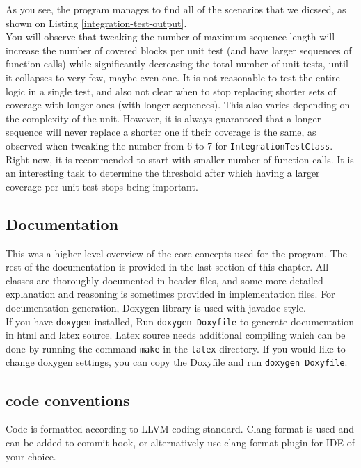 \documentclass{elteikthesis}[2018/06/06]
\newcommand*{\code}{\lstinline[keywordstyle=\color{violet}, basicstyle=\color{violet}]}
\renewcommand{\footnote}{\endnote}
\begin{document}
As you see, the program manages to find all of the scenarios that we dicssed, as shown on Listing \ref{integration-test-output}. \\

You will observe that tweaking the number of maximum sequence length will increase the number of covered blocks per unit test (and have larger sequences of function calls) while significantly decreasing the total number of unit tests, until it collapses to very few, maybe even one. It is not reasonable to test the entire logic in a single test, and also not clear when to stop replacing shorter sets of coverage with longer ones (with longer sequences). This also varies depending on the complexity of the unit. However, it is always guaranteed that a longer sequence will never replace a shorter one if their coverage is the same, as observed when tweaking the number from 6 to 7 for \code{IntegrationTestClass}. \\
Right now, it is recommended to start with smaller number of function calls. It is an interesting task to determine the threshold after which having a larger coverage per unit test stops being important. \\

\subsection{Documentation}
\label{sec-3-1-3}
This was a higher-level overview of the core concepts used for the program. The rest of the documentation is provided in the last section of this chapter. All classes are thoroughly documented in header files, and some more detailed explanation and reasoning is sometimes provided in implementation files. For documentation generation, Doxygen library is used with javadoc style. \\

If you have \code{doxygen} installed, Run \code{doxygen Doxyfile} to generate documentation in html and latex source. Latex source needs additional compiling which can be done by running the command \code{make} in the \code{latex} directory. If you would like to change doxygen settings, you can copy the Doxyfile and run \code{doxygen Doxyfile}. \\
\subsection{code conventions}
\label{sec-3-1-4}
Code is formatted according to LLVM coding standard\footnote{DEFINITION NOT FOUND.}. Clang-format\footnote{DEFINITION NOT FOUND.} is used and can be added to commit hook, or alternatively use clang-format plugin for IDE of your choice. \\
\end{document}
